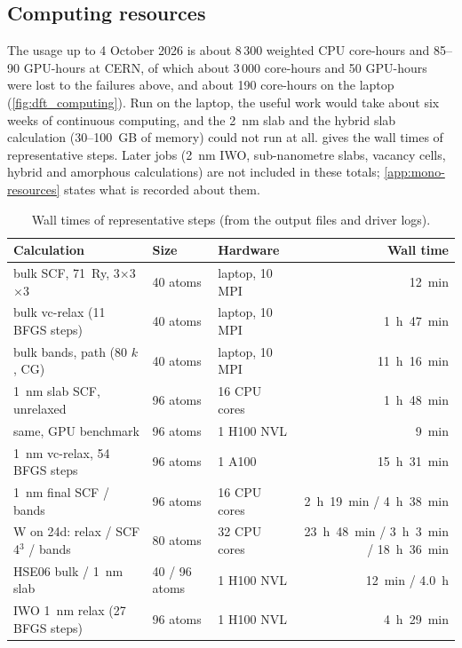 \subsection{Computing resources}
\label{sec:dft-resources}

The usage up to 4 October 2026 is about 8\,300 weighted CPU core-hours and 85--90 GPU-hours at CERN, of which about 3\,000
core-hours and 50 GPU-hours were lost to the failures above, and about 190 core-hours on the laptop
(\cref{fig:dft_computing}). Run on the laptop, the useful work would take about six weeks of continuous computing, and
the 2~nm slab and the hybrid slab calculation (30--100~GB of memory) could not run at all. 
gives the wall times of representative steps. Later jobs (2~nm IWO, sub-nanometre slabs, vacancy cells, hybrid and
amorphous calculations) are not included in these totals; \cref{app:mono-resources} states what is recorded about them.

\begin{table}[htbp]\centering\footnotesize
\caption{Wall times of representative steps (from the output files and driver logs).}
\label{tab:dft-timing}
\begin{tabular}{@{}lllr@{}}
\toprule
Calculation & Size & Hardware & Wall time \\
\midrule
bulk SCF, 71~Ry, 3$\times$3$\times$3 & 40 atoms & laptop, 10 MPI & 12~min \\
bulk vc-relax (11 BFGS steps) & 40 atoms & laptop, 10 MPI & 1~h~47~min \\
bulk bands, path (80 $k$, CG) & 40 atoms & laptop, 10 MPI & 11~h~16~min \\
1~nm slab SCF, unrelaxed & 96 atoms & 16 CPU cores & 1~h~48~min \\
same, GPU benchmark & 96 atoms & 1 H100 NVL & 9~min \\
1~nm vc-relax, 54 BFGS steps & 96 atoms & 1 A100 & 15~h~31~min \\
1~nm final SCF / bands & 96 atoms & 16 CPU cores & 2~h~19~min / 4~h~38~min \\
W on 24d: relax / SCF 4$^3$ / bands & 80 atoms & 32 CPU cores & 23~h~48~min / 3~h~3~min / 18~h~36~min \\
HSE06 bulk / 1~nm slab & 40 / 96 atoms & 1 H100 NVL & 12~min / 4.0~h \\
IWO 1~nm relax (27 BFGS steps) & 96 atoms & 1 H100 NVL & 4~h~29~min \\
\bottomrule
\end{tabular}
\end{table}

